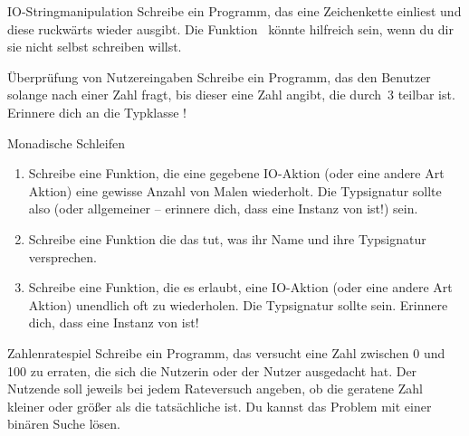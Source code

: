 \documentclass{uebblatt}
\begin{document}
\begin{aufgabe}{IO-Stringmanipulation}
Schreibe ein Programm, das eine Zeichenkette einliest und diese ruckwärts wieder ausgibt. Die Funktion~ könnte hilfreich sein, wenn du dir sie nicht selbst schreiben willst.
\end{aufgabe}

\begin{aufgabe}{Überprüfung von Nutzereingaben}
Schreibe ein Programm, das den Benutzer solange nach einer Zahl fragt, bis dieser eine Zahl angibt, die durch~3 teilbar ist. Erinnere dich an die Typklasse !
\end{aufgabe}

\begin{aufgabe}{Monadische Schleifen}
\begin{enumerate}
\item Schreibe eine Funktion, die eine gegebene IO-Aktion (oder eine andere Art Aktion) eine gewisse Anzahl von Malen wiederholt. Die Typsignatur sollte also  (oder allgemeiner  -- erinnere dich, dass  eine Instanz von  ist!) sein.
\item Schreibe eine Funktion  die das tut, was ihr Name und ihre Typsignatur versprechen.
\item Schreibe eine Funktion, die es erlaubt, eine IO-Aktion (oder eine andere Art Aktion) unendlich oft zu wiederholen. Die Typsignatur sollte  sein. Erinnere dich, dass  eine Instanz von  ist!
\end{enumerate}
\end{aufgabe}

\begin{aufgabe}{Zahlenratespiel}
Schreibe ein Programm, das versucht eine Zahl zwischen 0 und 100 zu erraten, die sich die Nutzerin oder der Nutzer ausgedacht hat. Der Nutzende soll jeweils bei jedem Rateversuch angeben, ob die geratene Zahl kleiner oder größer als die tatsächliche ist. Du kannst das Problem mit einer binären Suche lösen.
\end{aufgabe}
\end{document}
